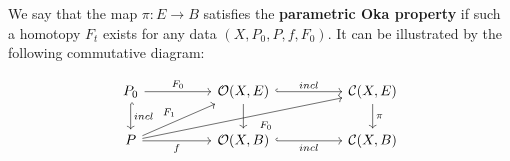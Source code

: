 \documentclass[10pt]{amsart}
\theoremstyle{remark}
\newtheorem{defi}[theo]{Definition}
\begin{document}
We say that the map $\pi: E \to B$ satisfies the \textbf{parametric Oka property} if such a homotopy $F_t$ exists for any data $(X, P_0, P, f, F_0)$. 
It can be illustrated by the following commutative diagram:

\[
\begin{tikzcd}
P_0 \arrow[d, hook, "incl"] \arrow[rr, "F_0"] & & \mathcal{O}(X, E)  \arrow[d, ""] \arrow[rr, hook, "incl"]  & & \mathcal{C}(X, E) \arrow[d, "\pi"] \\
P \arrow[urr, "F_1"] \arrow[urrrr, "\quad F_0"'] \arrow[rr, "f"'] & &\mathcal{O}(X, B) \arrow[rr, hook, "incl"'] & & \mathcal{C}(X, B)
\end{tikzcd}
\]

\end{document}
